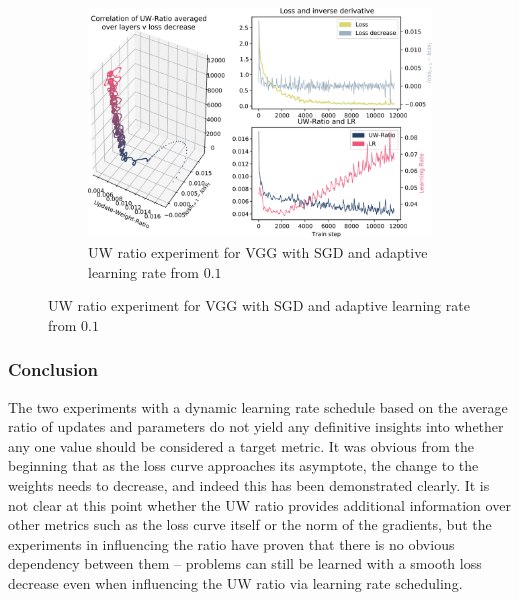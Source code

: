 \begin{figure}

    \begin{subfigure}{\textwidth}
        \centering
        \includegraphics[width=\linewidth]{gfx/diagrams/experiments/ratio_loss_correlation/vgg_sgd_01_0_11700_ratio_schedule.pdf}
        \caption{UW ratio experiment for VGG with SGD and adaptive learning rate
            from $0.1$}
        \label{fig:ratio_loss_corr_vgg_sgd_01_adaptive}
    \end{subfigure}
\end{figure}

\subsubsection{Conclusion}

The two experiments with a dynamic learning rate schedule based on the average
ratio of updates and parameters do not yield any definitive insights into
whether any one value should be considered a target metric. It was obvious from
the beginning that as the loss curve approaches its asymptote, the change to the
weights needs to decrease, and indeed this has been demonstrated clearly. It is
not clear at this point whether the UW ratio provides additional information
over other metrics such as the loss curve itself or the norm of the gradients,
but the experiments in influencing the ratio have proven that there is no
obvious dependency between them -- problems can still be learned with a smooth
loss decrease even when influencing the UW ratio via learning rate scheduling.

